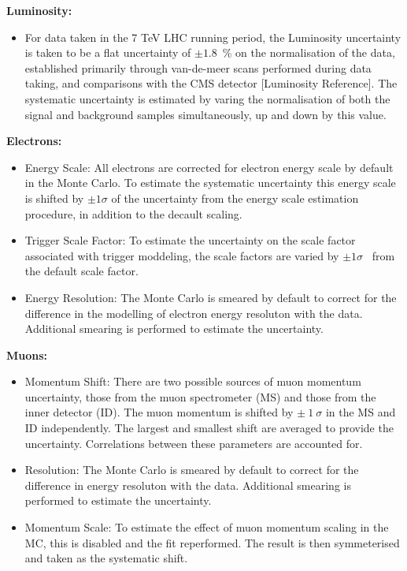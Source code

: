 \vspace{5mm}
\noindent
\textbf{Luminosity:}
\begin{itemize} 
     \item For data taken in the 7 TeV LHC running period, the Luminosity uncertainty is taken to be a flat uncertainty of $\pm1.8$~\% on the normalisation of the data, established primarily through van-de-meer scans performed during data taking, and comparisons with the CMS detector [Luminosity Reference]. The systematic uncertainty is estimated by varing the normalisation of both the signal and background samples simultaneously, up and down by this value.
\end{itemize}

\vspace{5mm}
\noindent
\textbf{Electrons:}
\begin{itemize}
    \item Energy Scale: All electrons are corrected for electron energy scale by default in the Monte Carlo. To estimate the systematic uncertainty this energy scale is shifted by $\pm 1\sigma$ of the uncertainty from the energy scale estimation procedure, in addition to the decault scaling. 
    \item Trigger Scale Factor: To estimate the uncertainty on the scale factor associated with trigger moddeling, the scale factors are varied by $\pm 1\sigma$~ from the default scale factor.
    \item Energy Resolution: The Monte Carlo is smeared by default to correct for the difference in the modelling of electron energy resoluton with the data. Additional smearing is performed to estimate the uncertainty.
\end{itemize}

\vspace{5mm}
\noindent
\textbf{Muons:}
\begin{itemize}
    \item Momentum Shift: There are two possible sources of muon momentum uncertainty, those from the muon spectrometer (MS) and those from the inner detector (ID). The muon momentum is shifted by $\pm~1~\sigma$ in the MS and ID independently. The largest and smallest shift are averaged to provide the uncertainty. Correlations between these parameters are accounted for.
    \item Resolution: The Monte Carlo is smeared by default to correct for the difference in energy resoluton with the data. Additional smearing is performed to estimate the uncertainty.
    \item Momentum Scale: To estimate the effect of muon momentum scaling in the MC, this is disabled and the fit reperformed. The result is then symmeterised and taken as the systematic shift.
\end{itemize}

